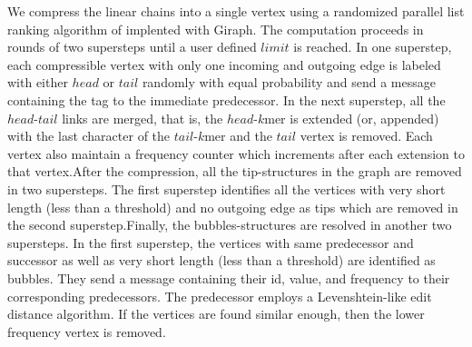 \documentclass[journal]{IEEEtran}
\begin{document}
We compress the linear chains into a single vertex using a randomized parallel list ranking algorithm of \cite{algo:parallellistrank} implented with Giraph. The computation proceeds in rounds of two supersteps until a user defined $limit$ is reached. In one superstep, each compressible vertex with only one incoming and outgoing edge is labeled with either $head$ or $tail$ randomly with equal probability and send a message containing the tag to the immediate predecessor. In the next superstep, all the $head$-$tail$ links are merged, that is, the $head$-$k$mer is extended (or, appended) with the last character of the $tail$-$k$mer and the $tail$ vertex is removed. Each vertex also maintain a frequency counter which increments after each extension to that vertex.After the compression, all the tip-structures in the graph are removed in two supersteps. The first superstep identifies all the vertices with very short length (less than a threshold) and no outgoing edge as tips which are removed in the second superstep.Finally, the bubbles-structures are resolved in another two supersteps. In the first superstep, the vertices with same predecessor and successor as well as very short length (less than a threshold) are identified as bubbles. They send a message containing their id, value, and frequency to their corresponding predecessors. The predecessor employs a Levenshtein-like edit distance algorithm. If the vertices are found similar enough, then the lower frequency vertex is removed. 


%
\end{document}
